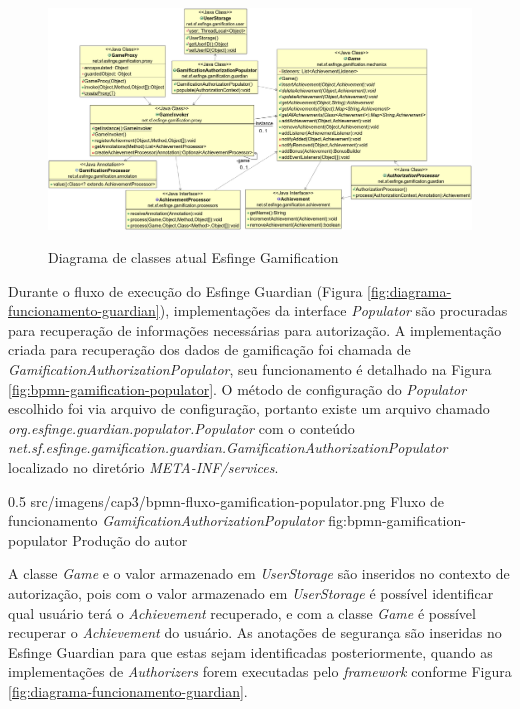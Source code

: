\begin{landscape}
    \begin{figure}    \caption{Diagrama de classes atual Esfinge Gamification}
    \includegraphics[scale=0.42]{src/imagens/cap3/gamification-class-diagram-cap3.png}
    \label{fig:gamification-diagrama-classe-cap3}
    \end{figure}
\end{landscape}

\par Durante o fluxo de execução do Esfinge Guardian (Figura \ref{fig:diagrama-funcionamento-guardian}), implementações da interface \textit{Populator} são procuradas para recuperação de informações necessárias para autorização. A implementação criada para recuperação dos dados de gamificação foi chamada de \textit{GamificationAuthorizationPopulator}, seu funcionamento é detalhado na Figura \ref{fig:bpmn-gamification-populator}. O método de configuração do \textit{Populator} escolhido foi via arquivo de configuração, portanto existe um arquivo chamado \textit{org.esfinge.guardian.populator.Populator} com o conteúdo \textit{net.sf.esfinge.gamification.guardian.GamificationAuthorizationPopulator} localizado no diretório \textit{META-INF/services}. 

\begin{image}
{0.5}
{src/imagens/cap3/bpmn-fluxo-gamification-populator.png}
{Fluxo de funcionamento \textit{GamificationAuthorizationPopulator}}
{fig:bpmn-gamification-populator}
{Produção do autor}
\end{image}

\par A classe \textit{Game} e o valor armazenado em \textit{UserStorage} são inseridos no contexto de autorização, pois com o valor armazenado em \textit{UserStorage} é possível identificar qual usuário terá o \textit{Achievement} recuperado, e com a classe \textit{Game} é possível recuperar o \textit{Achievement} do usuário. As anotações de segurança são inseridas no Esfinge Guardian para que estas sejam identificadas posteriormente, quando as implementações de \textit{Authorizers} forem executadas pelo \textit{framework} conforme Figura \ref{fig:diagrama-funcionamento-guardian}.

